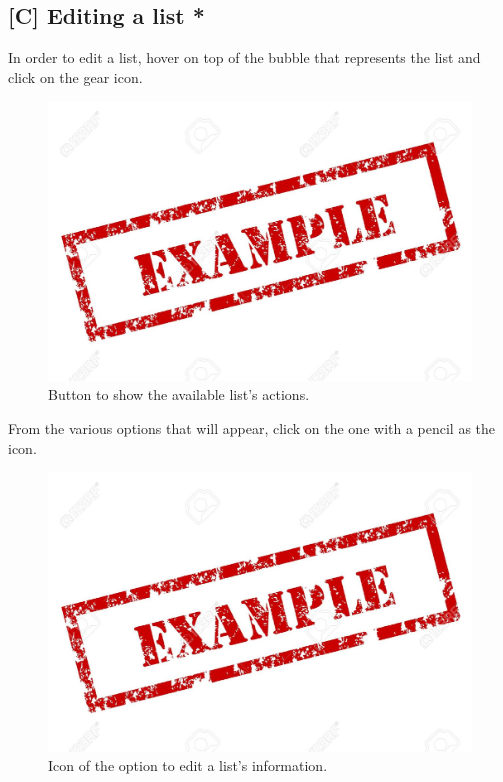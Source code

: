 \subsection{[C] Editing a list *}
In order to edit a list, hover on top of the bubble that represents the list and click on the gear icon.

\begin{figure}[H]
  \centering 
  \includegraphics[width=\textwidth]{Sections/3-HowToUse/Images/example.jpeg}
  \caption{Button to show the available list's actions.}
\end{figure}

From the various options that will appear, click on the one with a pencil as the icon.

\begin{figure}[H]
  \centering 
  \includegraphics[width=\textwidth]{Sections/3-HowToUse/Images/example.jpeg}
  \caption{Icon of the option to edit a list's information.}
\end{figure}

